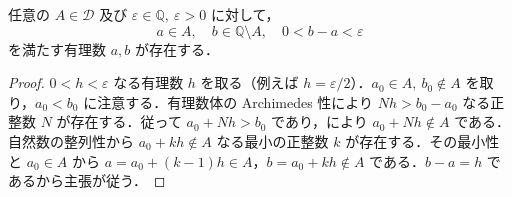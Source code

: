 \begin{prop}[切断を挟む有理数]
任意の $A\in\mathcal D$ 及び $\varepsilon\in\mathbb Q,\ \varepsilon>0$ に対して，
\[
 a\in A,\quad b\in\mathbb Q\setminus A,\quad 0<b-a<\varepsilon
\]
を満たす有理数 $a,b$ が存在する．
\end{prop}
\begin{proof}
$0<h<\varepsilon$ なる有理数 $h$ を取る（例えば $h=\varepsilon/2$）．$a_0\in A,\ b_0\notin A$ を取り，$a_0<b_0$ に注意する．有理数体の Archimedes 性により $Nh>b_0-a_0$ なる正整数 $N$ が存在する．従って $a_0+Nh>b_0$ であり，により $a_0+Nh\notin A$ である．自然数の整列性から $a_0+kh\notin A$ なる最小の正整数 $k$ が存在する．その最小性と $a_0\in A$ から $a=a_0+(k-1)h\in A$，$b=a_0+kh\notin A$ である．$b-a=h$ であるから主張が従う．
\end{proof}
